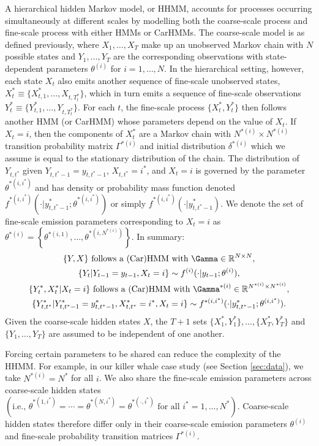 A hierarchical hidden Markov model, or HHMM, accounts for processes occurring simultaneously at different scales by modelling both the coarse-scale process and fine-scale process with either HMMs \citep{Barajas:2017,Adam:2019} or CarHMMs. The coarse-scale model is as defined previously, where $X_1, \ldots, X_T$ make up an unobserved Markov chain with $N$ possible states and $Y_1,\ldots, Y_T$ are the corresponding observations with state-dependent parameters $\theta^{(i)}$ for $i = 1,\ldots,N$.   
%
In the hierarchical setting, however, each state $X_t$ also emits another sequence of fine-scale unobserved states, $X_t^* \equiv \{X_{t,1}^*,\ldots, X_{t,T_t^*}\}$, which in turn emits a sequence of fine-scale observations $Y_t^* \equiv \{Y_{t,1}^*,\ldots, Y_{t,T_t^*}\}$. For each $t$, the fine-scale process $\{X_t^*, Y_t^*\}$ then follows another HMM (or CarHMM) whose parameters depend on the value of $X_t$. If $X_t = i$, then the components of $X_t^*$ are a Markov chain with $N^{*(i)} \times N^{*(i)}$ transition probability matrix $\Gamma^{*(i)}$ and initial distribution $\delta^{*(i)}$ which we assume is equal to the stationary distribution of the chain. The distribution of $Y_{t,t^*}$ given $Y_{t,t^*-1} = y_{t,t^*-1}$, $X_{t,t^*}=i^*$, and $X_t=i$ is governed by the parameter $\theta^{*(i,i^*)}$ and has density or probability mass function denoted $f^{*(i,i^*)}\left(\cdot|y^*_{t,t^*-1}; \theta^{*(i,i^*)}\right)$ or simply $f^{*(i,i^*)}(\cdot|y^*_{t,t^*-1})$. We denote the set of fine-scale emission parameters corresponding to $X_t=i$ as $\theta^{*(i)}=\left\{\theta^{*(i,1)}, \ldots, \theta^{*(i,N^{*(i)})}\right\}$. In summary:
%
%
\begin{gather*}
    \{Y, X\} \text{ follows a (Car)HMM with } \Gamma \in \bbR^{N \times N}, \\
    \{Y_t | Y_{t-1} = y_{t-1}, X_t = i\} \sim f^{(i)}(\cdot|y_{t-1};\theta^{(i)}), \\
    \{Y^*_t,X^*_t | X_t = i\} \text{ follows a (Car)HMM with } \Gamma^{*(i)} \in \bbR^{N^{*(i)} \times N^{*(i)}}, \\
    \{Y^*_{t,t^*} | Y^*_{t,t^*-1} = y^*_{t,t^*-1}, X^*_{t,t^*} = i^*, X_t = i\} \sim f^{*(i,i^*)}(\cdot|y^{*}_{t,t^*-1};\theta^{(i,i^*)}).
\end{gather*}
Given the coarse-scale hidden states $X$, the $T+1$ sets $\{X_1^*, Y_1^*\}, \ldots, \{X_T^*, Y_T^*\}$ and $\{Y_1,\ldots,Y_T\}$ are assumed to be independent of one another.
%
%

Forcing certain parameters to be shared can reduce the complexity of the HHMM. For example, in our killer whale case study (see Section \ref{sec:data}), we take $N^{*(i)} = N^*$ for all $i$. We also share the fine-scale emission parameters across coarse-scale hidden states $\left( \text{i.e., } \theta^{*(1,i^*)} = \cdots = \theta^{*(N,i^*)} = \theta^{*(\cdot,i^*)} \text{ for all } i^* = 1, \ldots, N^* \right)$. Coarse-scale hidden states therefore differ only in their coarse-scale emission parameters $\theta^{(i)}$ and fine-scale probability transition matrices $\Gamma^{*(i)}$.

